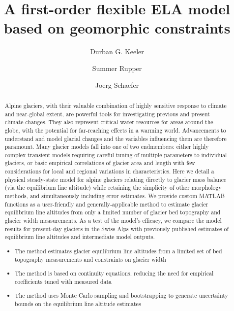 \documentclass[review]{elsarticle}
\begin{document}
\begin{frontmatter}

\title{A first-order flexible ELA model based on geomorphic constraints}

\author[Utah]{Durban G. Keeler}
\author[Utah]{Summer Rupper}
\address[Utah]{Department of Geography, University of Utah, Salt Lake City, UT USA}

\author[Columbia]{Joerg Schaefer}
\address[Columbia]{Lamont-Doherty Earth Observatory, Columbia University, Palisades, NY USA}

\begin{abstract}
Alpine glaciers, with their valuable combination of highly sensitive response to climate and near-global extent, are powerful tools for investigating previous and present climate changes.
They also represent critical water resources for areas around the globe, with the potential for far-reaching effects in a warming world.
Advancements to understand and model glacial changes and the variables influencing them are therefore paramount.
Many glacier models fall into one of two endmembers: either highly complex transient models requiring careful tuning of multiple parameters to individual glaciers, or basic empirical correlations of glacier area and length with few considerations for local and regional variations in characteristics.
Here we detail a physical steady-state model for alpine glaciers relating directly to glacier mass balance (via the equilibrium line altitude) while retaining the simplicity of other morphology methods, and simultaneously including error estimates.
We provide custom MATLAB functions as a user-friendly and generally-applicable method to estimate glacier equilibrium line altitudes from only a limited number of glacier bed topography and glacier width measurements.
As a test of the model’s efficacy, we compare the model results for present-day glaciers in the Swiss Alps with previously published estimates of equilibrium line altitudes and intermediate model outputs.

\begin{itemize}
    \item The method estimates glacier equilibrium line altitudes from a limited set of bed topography measurements and constraints on glacier width
    \item The method is based on continuity equations, reducing the need for empirical coefficients tuned with measured data
    \item The method uses Monte Carlo sampling and bootstrapping to generate uncertainty bounds on the equilibrium line altitude estimates
\end{itemize}


\end{abstract}
\end{frontmatter}
\end{document}
